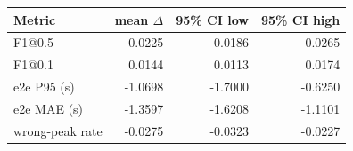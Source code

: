 \begin{tabular}{lrrr}
\toprule
Metric & mean $\Delta$ & 95\% CI low & 95\% CI high \\
\midrule
F1@0.5 & 0.0225 & 0.0186 & 0.0265 \\
F1@0.1 & 0.0144 & 0.0113 & 0.0174 \\
e2e P95 (s) & -1.0698 & -1.7000 & -0.6250 \\
e2e MAE (s) & -1.3597 & -1.6208 & -1.1101 \\
wrong-peak rate & -0.0275 & -0.0323 & -0.0227 \\
\bottomrule
\end{tabular}
